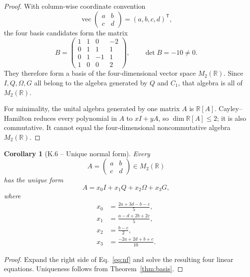 \documentclass[11pt,letterpaper]{article}
\theoremstyle{kernelstyle}
\newtheorem{corollary}[theorem]{Corollary}
\newcommand{\R}{\mathbb{R}}
\newcommand{\vecc}{\operatorname{vec}}
\begin{document}
\begin{proof}
With column-wise coordinate convention
\[
\vecc\!\begin{pmatrix}a&b\\c&d\end{pmatrix}=(a,b,c,d)^{\mathsf T},
\]
the four basis candidates form the matrix
\[
B=
\begin{pmatrix}
1&1&0&-2\\
0&1&1&1\\
0&1&-1&1\\
1&0&0&2
\end{pmatrix},
\qquad
\det B=-10\ne0.
\]
They therefore form a basis of the four-dimensional vector space $M_2(\R)$.  Since $I,Q,\Omega,G$ all belong to the algebra generated by $Q$ and $C_1$, that algebra is all of $M_2(\R)$.

For minimality, the unital algebra generated by one matrix $A$ is $\R[A]$.  Cayley--Hamilton reduces every polynomial in $A$ to $xI+yA$, so $\dim\R[A]\le2$; it is also commutative.  It cannot equal the four-dimensional noncommutative algebra $M_2(\R)$.
\end{proof}

\begin{corollary}[K.6 -- Unique normal form]\label{cor:normalform}
Every
\[
A=\begin{pmatrix}a&b\\c&d\end{pmatrix}\in M_2(\R)
\]
has the unique form
\begin{equation}\label{eq:nf}
A=x_0I+x_1Q+x_2\Omega+x_3G,
\end{equation}
where
\begin{align}
 x_0&=\frac{2a+3d-b-c}{5},\label{eq:x0}\\
 x_1&=\frac{a-d+2b+2c}{5},\label{eq:x1}\\
 x_2&=\frac{b-c}{2},\label{eq:x2}\\
 x_3&=\frac{-2a+2d+b+c}{10}.\label{eq:x3}
\end{align}
\end{corollary}

\begin{proof}
Expand the right side of Eq.~\eqref{eq:nf} and solve the resulting four linear equations.  Uniqueness follows from Theorem~\ref{thm:basis}.
\end{proof}
\end{document}
